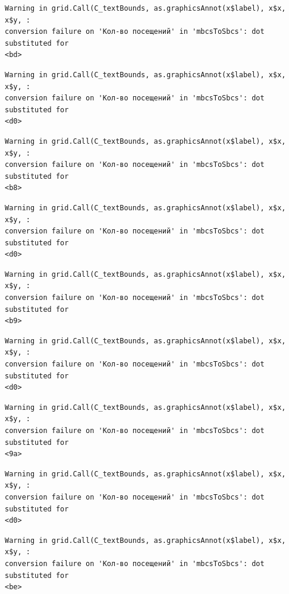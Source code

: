 \documentclass[
  letterpaper,
  DIV=11,
  numbers=noendperiod]{scrartcl}
\begin{document}
\begin{verbatim}
Warning in grid.Call(C_textBounds, as.graphicsAnnot(x$label), x$x, x$y, :
conversion failure on 'Кол-во посещений' in 'mbcsToSbcs': dot substituted for
<bd>
\end{verbatim}

\begin{verbatim}
Warning in grid.Call(C_textBounds, as.graphicsAnnot(x$label), x$x, x$y, :
conversion failure on 'Кол-во посещений' in 'mbcsToSbcs': dot substituted for
<d0>
\end{verbatim}

\begin{verbatim}
Warning in grid.Call(C_textBounds, as.graphicsAnnot(x$label), x$x, x$y, :
conversion failure on 'Кол-во посещений' in 'mbcsToSbcs': dot substituted for
<b8>
\end{verbatim}

\begin{verbatim}
Warning in grid.Call(C_textBounds, as.graphicsAnnot(x$label), x$x, x$y, :
conversion failure on 'Кол-во посещений' in 'mbcsToSbcs': dot substituted for
<d0>
\end{verbatim}

\begin{verbatim}
Warning in grid.Call(C_textBounds, as.graphicsAnnot(x$label), x$x, x$y, :
conversion failure on 'Кол-во посещений' in 'mbcsToSbcs': dot substituted for
<b9>
\end{verbatim}

\begin{verbatim}
Warning in grid.Call(C_textBounds, as.graphicsAnnot(x$label), x$x, x$y, :
conversion failure on 'Кол-во посещений' in 'mbcsToSbcs': dot substituted for
<d0>
\end{verbatim}

\begin{verbatim}
Warning in grid.Call(C_textBounds, as.graphicsAnnot(x$label), x$x, x$y, :
conversion failure on 'Кол-во посещений' in 'mbcsToSbcs': dot substituted for
<9a>
\end{verbatim}

\begin{verbatim}
Warning in grid.Call(C_textBounds, as.graphicsAnnot(x$label), x$x, x$y, :
conversion failure on 'Кол-во посещений' in 'mbcsToSbcs': dot substituted for
<d0>
\end{verbatim}

\begin{verbatim}
Warning in grid.Call(C_textBounds, as.graphicsAnnot(x$label), x$x, x$y, :
conversion failure on 'Кол-во посещений' in 'mbcsToSbcs': dot substituted for
<be>
\end{verbatim}
\end{document}
